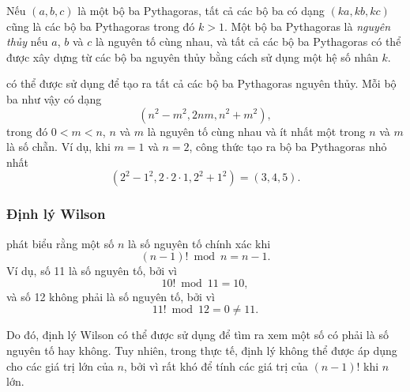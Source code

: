 Nếu $(a,b,c)$ là một bộ ba Pythagoras,
tất cả các bộ ba có dạng $(ka,kb,kc)$
cũng là các bộ ba Pythagoras trong đó $k>1$.
Một bộ ba Pythagoras là \emph{nguyên thủy} nếu
$a$, $b$ và $c$ là nguyên tố cùng nhau,
và tất cả các bộ ba Pythagoras có thể được xây dựng
từ các bộ ba nguyên thủy bằng cách sử dụng một hệ số nhân $k$.

 có thể được sử dụng để tạo ra
tất cả các bộ ba Pythagoras nguyên thủy.
Mỗi bộ ba như vậy có dạng
\[(n^2-m^2,2nm,n^2+m^2),\]
trong đó $0<m<n$, $n$ và $m$ là nguyên tố cùng nhau
và ít nhất một trong $n$ và $m$ là số chẵn.
Ví dụ, khi $m=1$ và $n=2$, công thức
tạo ra bộ ba Pythagoras nhỏ nhất
\[(2^2-1^2,2\cdot2\cdot1,2^2+1^2)=(3,4,5).\]

\subsubsection{Định lý Wilson}


phát biểu rằng một số $n$
là số nguyên tố chính xác khi
\[(n-1)! \bmod n = n-1.\]
Ví dụ, số 11 là số nguyên tố, bởi vì
\[10! \bmod 11 = 10,\]
và số 12 không phải là số nguyên tố, bởi vì
\[11! \bmod 12 = 0 \neq 11.\]

Do đó, định lý Wilson có thể được sử dụng để tìm ra
xem một số có phải là số nguyên tố hay không. Tuy nhiên, trong thực tế, định lý không thể được
áp dụng cho các giá trị lớn của $n$, bởi vì rất khó
để tính các giá trị của $(n-1)!$ khi $n$ lớn.